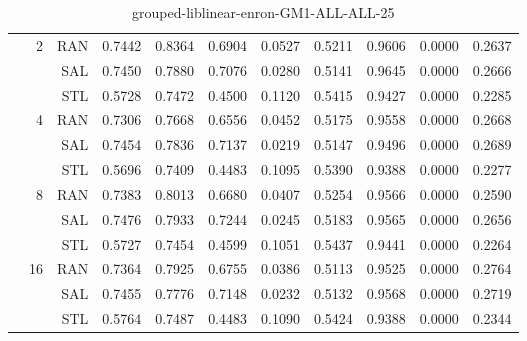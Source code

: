 \begin{center}
\begin{table}[htbp]
\begin{tabular}{ | r | r | r | r | r | r | r | r | r | r | r |}
 & \multirow{3}{*}{2} & RAN & 0.7442 & 0.8364 & 0.6904 & 0.0527 & 0.5211 & 0.9606 & 0.0000 & 0.2637\\ \cline{3-11}
 &   & SAL & 0.7450 & 0.7880 & 0.7076 & 0.0280 & 0.5141 & 0.9645 & 0.0000 & 0.2666\\ \cline{3-11}
 &   & STL & 0.5728 & 0.7472 & 0.4500 & 0.1120 & 0.5415 & 0.9427 & 0.0000 & 0.2285\\ \cline{2-11}
 & \multirow{3}{*}{4} & RAN & 0.7306 & 0.7668 & 0.6556 & 0.0452 & 0.5175 & 0.9558 & 0.0000 & 0.2668\\ \cline{3-11}
 &   & SAL & 0.7454 & 0.7836 & 0.7137 & 0.0219 & 0.5147 & 0.9496 & 0.0000 & 0.2689\\ \cline{3-11}
 &   & STL & 0.5696 & 0.7409 & 0.4483 & 0.1095 & 0.5390 & 0.9388 & 0.0000 & 0.2277\\ \cline{2-11}
 & \multirow{3}{*}{8} & RAN & 0.7383 & 0.8013 & 0.6680 & 0.0407 & 0.5254 & 0.9566 & 0.0000 & 0.2590\\ \cline{3-11}
 &   & SAL & 0.7476 & 0.7933 & 0.7244 & 0.0245 & 0.5183 & 0.9565 & 0.0000 & 0.2656\\ \cline{3-11}
 &   & STL & 0.5727 & 0.7454 & 0.4599 & 0.1051 & 0.5437 & 0.9441 & 0.0000 & 0.2264\\ \cline{2-11}
 & \multirow{3}{*}{16} & RAN & 0.7364 & 0.7925 & 0.6755 & 0.0386 & 0.5113 & 0.9525 & 0.0000 & 0.2764\\ \cline{3-11}
 &   & SAL & 0.7455 & 0.7776 & 0.7148 & 0.0232 & 0.5132 & 0.9568 & 0.0000 & 0.2719\\ \cline{3-11}
 &   & STL & 0.5764 & 0.7487 & 0.4483 & 0.1090 & 0.5424 & 0.9388 & 0.0000 & 0.2344\\ \cline{2-11}
\hline
\end{tabular}
\caption{grouped-liblinear-enron-GM1-ALL-ALL-25}
\end{table}
\end{center}

